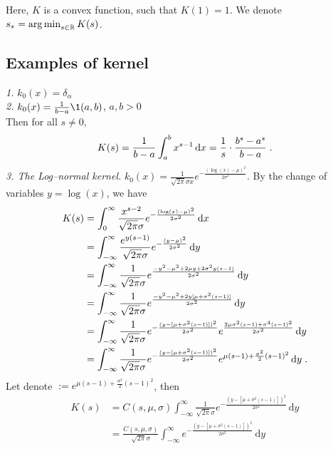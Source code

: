 \documentclass[11pt]{amsart}
\newcommand{\diff}{\,\mathrm{d}}
\begin{document}
Here, $K$ is a convex function, such that $K(1) = 1$. We denote $s_* = \mathop{\arg\min}_{s\in \mathbb{R}} K(s)$. 

\subsection{Examples of kernel}

\textit{1.} $k_0(x) = \delta_\alpha$ \\
\textit{2.} $k_0(x) = \frac{1}{b-a}\1{(a,b)}$, $a,b > 0$ \\
Then for all $s \neq 0$, 
    \begin{align*}
        K(s) = \frac{1}{b-a}\int_a^b x^{s-1}\diff x = \frac1s \cdot\frac{b^s - a^s}{b-a}
        \eqfinp
    \end{align*}
\textit{3. The Log--normal kernel.} $k_0(x) = \frac{1}{\sqrt{2\pi}\sigma x} e^{-\frac{(\log(x)-\mu)^2}{2\sigma^2}}$.
By the change of variables $y = \log(x)$, we have
    \begin{align*}
        K(s) 
        &= \int_0^\infty \frac{x^{s-2}}{\sqrt{2\pi}\sigma} e^{-\frac{(\log(x)-\mu)^2}{2\sigma^2}} \diff x \\
        &= \int_{-\infty}^\infty \frac{e^{y(s-1)}}{\sqrt{2\pi}\sigma} e^{-\frac{(y-\mu)^2}{2\sigma^2}} \diff y \\
        &=  \int_{-\infty}^\infty \frac{1}{\sqrt{2\pi}\sigma} e^{\frac{-y^2 - \mu^2 + 2\mu y + 2\sigma^2 y(s-1)}{2\sigma^2}} \diff y \\
        &=  \int_{-\infty}^\infty \frac{1}{\sqrt{2\pi}\sigma} e^{\frac{-y^2 - \mu^2 + 2y[\mu + \sigma^2 (s-1)]}{2\sigma^2}} \diff y \\
        &=  \int_{-\infty}^\infty \frac{1}{\sqrt{2\pi}\sigma} 
        e^{-\frac{(y - [\mu + \sigma^2 (s-1)])^2}{2\sigma^2}}
        e^{\frac{2\mu \sigma^2(s-1)+\sigma^4(s-1)^2}{2\sigma^2}}\diff y \\
        &=  \int_{-\infty}^\infty \frac{1}{\sqrt{2\pi}\sigma} 
        e^{-\frac{(y - [\mu + \sigma^2 (s-1)])^2}{2\sigma^2}}
        e^{\mu (s-1)+\frac{\sigma^2}{2}(s-1)^2}\diff y
        \eqfinp
    \end{align*}
Let denote $  := e^{\mu (s-1)+\frac{\sigma^2}{2}(s-1)^2}$, then 
\begin{align*}
    K(s) 
    &=  C(s,\mu,\sigma) \int_{-\infty}^\infty \frac{1}{\sqrt{2\pi}\sigma} 
        e^{-\frac{(y - [\mu + \sigma^2 (s-1)])^2}{2\sigma^2}}\diff y
        \\
        &=  \frac{C(s,\mu,\sigma)}{\sqrt{2\pi}\sigma} \int_{-\infty}^\infty
        e^{-\frac{(y - [\mu + \sigma^2 (s-1)])^2}{2\sigma^2}}\diff y
\end{align*}
\end{document}

